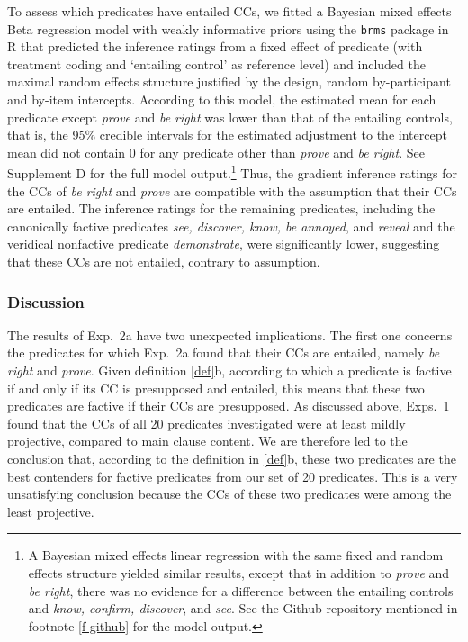 \documentclass{language}
\newcommand{\6}{\mbox{$[\hspace*{-.6mm}[$}}
\newcommand{\9}{\mbox{$]\hspace*{-.6mm}]$}}
\begin{document}
To assess which predicates have entailed CCs, we fitted a Bayesian mixed effects Beta regression model  with weakly informative priors using the \verb|brms|  package in R that predicted the inference ratings from a fixed effect of predicate (with treatment coding and `entailing control' as  reference level) and included the maximal random effects structure justified by the design, random by-participant and by-item intercepts. According to this model, the estimated mean for each predicate except {\em prove} and {\em be right} was lower than that of the entailing controls, that is, the 95\% credible intervals for the estimated adjustment to the intercept mean did not contain 0 for any predicate other than {\em prove} and {\em be right}. See Supplement D for the full model output.\footnote{A Bayesian mixed effects linear regression with the same fixed and random effects structure yielded similar results, except that in addition to {\em prove} and {\em be right}, there was no evidence for a difference between the entailing controls and \emph{know, confirm, discover}, and {\em see}. See the Github repository mentioned in footnote \ref{f-github} for the model output.} Thus, the gradient inference ratings for the CCs of {\em be right} and {\em prove} are compatible with the assumption that their CCs are entailed. The inference ratings for the remaining predicates, including the canonically factive predicates {\em see, discover, know, be annoyed}, and {\em reveal} and the veridical nonfactive predicate {\em demonstrate}, were significantly lower, suggesting that these CCs are not entailed, contrary to assumption. 



\subsubsection{Discussion}

The results of Exp.~2a have two unexpected implications. The first one concerns the predicates for which Exp.~2a found that their CCs are entailed, namely {\em be right} and {\em prove}. Given definition \ref{def}b, according to which a predicate is factive if and only if its CC is presupposed and entailed, this means that these two predicates are factive if their CCs are presupposed. As discussed above, Exps.~1 found that the CCs of all 20 predicates investigated were at least mildly projective, compared to main clause content. We are therefore led to the conclusion that, according to the definition in \ref{def}b, these two predicates are the best contenders for factive predicates from our set of 20 predicates. This is a very unsatisfying conclusion because the CCs of these two predicates were among the least projective. 
\end{document}
